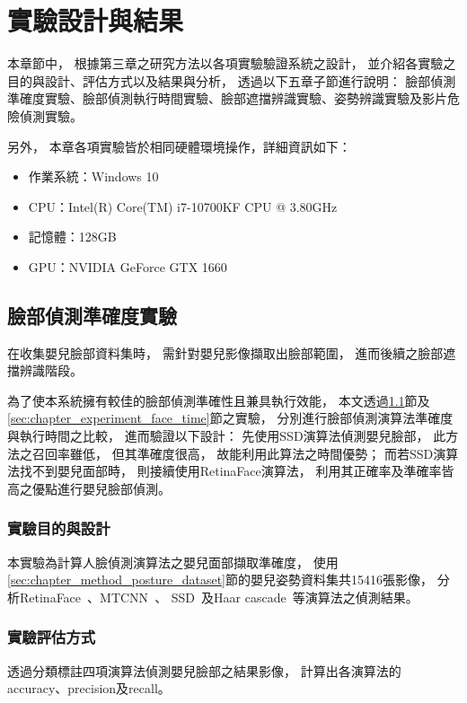 \documentclass[class=NCU_thesis, crop=false]{standalone}
\begin{document}
\chapter{實驗設計與結果}
本章節中，
根據第三章之研究方法以各項實驗驗證系統之設計，
並介紹各實驗之目的與設計、評估方式以及結果與分析，
透過以下五章子節進行說明：
臉部偵測準確度實驗、臉部偵測執行時間實驗、臉部遮擋辨識實驗、姿勢辨識實驗及影片危險偵測實驗。

另外，
本章各項實驗皆於相同硬體環境操作，詳細資訊如下：
\begin{itemize}
    \item 作業系統：Windows 10
    \item CPU：Intel(R) Core(TM) i7-10700KF CPU @ 3.80GHz
    \item 記憶體：128GB
    \item GPU：NVIDIA GeForce GTX 1660
\end{itemize}

\section{臉部偵測準確度實驗}
\label{sec:chapter_experiment_face_accuracy}
在收集嬰兒臉部資料集時，
需針對嬰兒影像擷取出臉部範圍，
進而後續之臉部遮擋辨識階段。

為了使本系統擁有較佳的臉部偵測準確性且兼具執行效能，
本文透過\ref{sec:chapter_experiment_face_accuracy}節及\ref{sec:chapter_experiment_face_time}節之實驗，
分別進行臉部偵測演算法準確度與執行時間之比較，
進而驗證以下設計：
先使用SSD演算法偵測嬰兒臉部，
此方法之召回率雖低，
但其準確度很高，
故能利用此算法之時間優勢；
而若SSD演算法找不到嬰兒面部時，
則接續使用RetinaFace演算法，
利用其正確率及準確率皆高之優點進行嬰兒臉部偵測。

\subsection{實驗目的與設計}
本實驗為計算人臉偵測演算法之嬰兒面部擷取準確度，
使用\ref{sec:chapter_method_posture_dataset}節的嬰兒姿勢資料集共15416張影像，
分析RetinaFace~\cite{deng_retinaface_2020}、MTCNN~\cite{zhang_joint_2016}、
SSD~\cite{ye_face_2021}及Haar cascade~\cite{goyal_face_2017}等演算法之偵測結果。

\subsection{實驗評估方式}
透過分類標註四項演算法偵測嬰兒臉部之結果影像，
計算出各演算法的accuracy、precision及recall。
\end{document}
